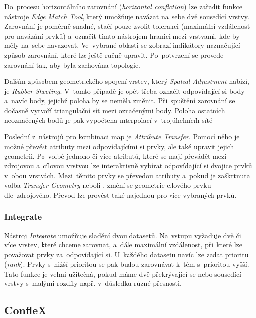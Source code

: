 Do~procesu horizontálního zarovnání (\textit{horizontal conflation}) lze 
zařadit funkce nástroje \textit{Edge Match Tool}, který umožňuje navázat 
na~sebe dvě sousedící vrstvy. Zarovnání je poměrně snadné, stačí pouze 
zvolit toleranci (maximální vzdálenost pro navázání prvků) a~označit tímto
nástrojem hranici mezi vrstvami, kde by měly na~sebe navazovat. Ve~vybrané
oblasti se zobrazí indikátory naznačující způsob zarovnání, které lze ještě
ručně upravit. Po~potvrzení se provede zarovnání tak, aby byla zachována
topologie.

Dalším způsobem geometrického spojení vrstev, který \textit{Spatial Adjustment}
nabízí, je \textit{Rubber Sheeting}. V~tomto případě je opět třeba označit 
odpovídající si body a~navíc body, jejichž poloha by se neměla změnit. 
Při~spuštění zarovnání se dočasně vytvoří triangulační síť mezi označenými body. 
Poloha ostatních neoznačených bodů je pak vypočtena interpolací v~trojúhelnícíh 
sítě.

Poslední z~nástrojů pro kombinaci map je \textit{Attribute Transfer}. Pomocí 
něho je možné převést atributy mezi odpovídajícími si prvky, ale také upravit
jejich geometrii. Po~volbě jednoho či více atributů, které se mají převádět 
mezi zdrojovou a~cílovou vrstvou lze interaktivně vybírat odpovídající si 
dvojice prvků v~obou vrstvách. Mezi~těmito prvky se převedou atributy a~pokud
je zaškrtnuta volba \textit{Transfer Geometry} neboli ,
změní se geometrie cílového prvku dle~zdrojového. Převod lze provést také 
najednou pro více vybraných prvků.

\subsubsection{Integrate}

Nástroj \textit{Integrate} umožňuje sladění dvou datasetů. Na~vstupu vyžaduje 
dvě či více vrstev, které chceme zarovnat, a~dále maximální vzdálenost, při~které
lze považovat prvky za~odpovídající si. U~každého datasetu navíc lze zadat 
prioritu (\textit{rank}). Prvky s~nižší prioritou se pak budou zarovnávat 
k~těm s~prioritou vyšší. Tato funkce je velmi užitečná, pokud máme dvě 
překrývající se nebo sousedící vrstvy s~malými rozdíly např. v~důsledku různé
přesnosti.


\subsection{ConfleX}
\label{conflex}

